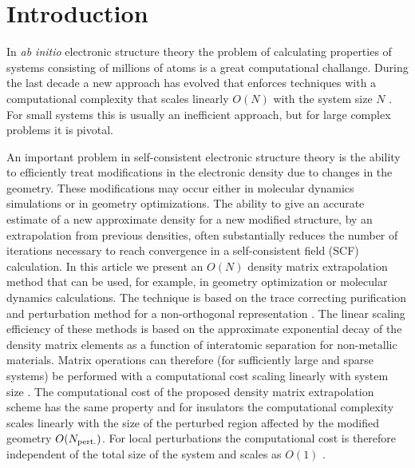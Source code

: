\documentclass[twocolumn,showpacs,preprintnumbers,amsmath,amssymb]{revtex4}
\begin{document}
\section{Introduction}

In {\it ab initio} electronic structure theory the problem of calculating 
properties of systems consisting of millions of atoms is a great 
computational challange.  During the last decade a new approach has evolved that
enforces techniques with a computational complexity that scales
linearly $O(N)$ with the system size $N$ \cite{Yang91,Galli92,Mauri93,Ordejon93,Li93,Stechel94,Goedecker94,Kim95,Wang95,Abrikosov96,Galli96,Kohn96,Bowler97,Sanches97,Yokojima98,Baer98,Guerra98,Goedecker99,Artacho99,Scuseria99,Ordejon00,Wu02,Yam03}.
For small systems this is usually an inefficient approach, but for large complex 
problems it is pivotal.

An important problem in self-consistent electronic structure theory is the ability to 
efficiently treat modifications in the electronic density due to changes in 
the geometry. These modifications may occur either in molecular dynamics
simulations or in geometry optimizations.  The ability to give an accurate estimate 
of a new approximate density for a new modified structure, by an extrapolation from previous 
densities, often substantially reduces the number of iterations necessary 
to reach convergence in a self-consistent field (SCF) calculation. In this article 
we present an $O(N)$  density matrix extrapolation method 
that can be used, for example, in geometry optimization or molecular dynamics calculations.
The technique is based on the trace correcting purification and perturbation method 
for a non-orthogonal representation \cite{NiklassonTC2,NiklassonPRT1,WeberPRT2,NiklassonNO}.
The linear scaling efficiency of these methods is based on the approximate 
exponential decay of the density matrix elements as a function of interatomic 
separation for non-metallic materials. Matrix operations can therefore (for sufficiently 
large and sparse systems) be performed with a computational cost scaling linearly
with system size \cite{NiklassonTRS4,WeberPRT2}. The computational cost of the proposed density matrix
extrapolation scheme has the same property and for insulators the computational complexity 
scales linearly with the size of the perturbed region affected by the modified
geometry $O(N_{\rm pert.})$. For local perturbations the computational cost 
is therefore independent of the total size of the system and scales as $O(1)$ \cite{NiklassonPRT1}.
\end{document}
